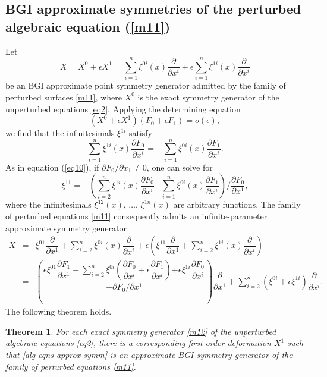\documentclass[11pt,letter,subeqn]{article}
\def\beq{\begin{equation}}
\def\eeq{\end{equation}}
\newtheorem{theorem}{Theorem}[section]
\begin{document}
\subsection{BGI approximate symmetries of the perturbed algebraic equation (\ref{m11})}\label{sec:Pr:sym}
Let
\beq \label{alg eqns approx symm}
      X= X^0+\epsilon X^1 = \sum_{i=1}^{n}\xi^{0i}(x)\dfrac{\partial}{\partial x^i} +\epsilon \sum_{i=1}^{n}\xi^{1i}(x)\dfrac{\partial}{\partial x^i}
\eeq
be an BGI approximate point symmetry generator admitted by the family of perturbed surfaces \eqref{m11}, where $X^0$ is the exact symmetry generator of the unperturbed equations \eqref{eq2}. Applying the determining equation
\[
  \left( X^0+\epsilon X^1\right)\left(F_0+\epsilon F_1\right)=o(\epsilon),
\]
we find that the infinitesimals $\xi^{1i}$ satisfy
\begin{equation}\label{m104}
\sum_{i=1}^{n}\xi^{1i}(x)\dfrac{\partial F_0}{\partial x^i}=- \sum_{i=1}^{n}\xi^{0i}(x)\dfrac{\partial F_1}{\partial x^i}.
\end{equation}
As in equation (\ref{eq10}), if ${\partial
F_0}\big/{\partial x_1}\neq 0$, one can solve for
\begin{equation}\label{eq11}
\xi^{11}= -\left({\sum_{i=2}^{n}\xi^{1i}(x)\frac{\partial F_0}{\partial x^i}}{+\sum_{i=1}^{n}\xi^{0i}(x)\frac{\partial F_1}{\partial x^i}}\right)\bigg/{\frac{\partial
F_0}{\partial x^1}},
\end{equation}
where the infinitesimals $\xi^{12}(x)$, $\ldots$, $\xi^{1n}(x)$ are arbitrary functions. The family of perturbed equations \eqref{m11} consequently admits an infinite-parameter approximate symmetry generator
\begin{eqnarray}\label{eq19}
\nonumber %
X &=& \xi^{01}\dfrac{\partial}{\partial x^1}+ \sum_{i=2}^{n}\xi^{0i}(x)\dfrac{\partial}{\partial x^i}+\epsilon \left(\xi^{11}\dfrac{\partial}{\partial x^1}+
\sum_{i=2}^{n}\xi^{1i}(x)\dfrac{\partial}{\partial x^i}\right) \\
&=&  \left(\dfrac{{\epsilon \xi^{01} \dfrac{\partial F_1}{\partial x^1}+\sum \limits_{i=2}^{n}\xi^{0i}\left(\dfrac{\partial F_0}{\partial x^i}+\epsilon \dfrac{\partial
F_1}{\partial x^i} \right)}{+\epsilon \xi^{1i}\dfrac{\partial F_0}{\partial x^i}}} {{{-\partial F_0}\big/{\partial x^1}}}\right)\dfrac{\partial}{\partial
x^1}+\sum_{i=2}^{n}\left(\xi^{0i}+\epsilon \xi^{1i}\right)\dfrac{\partial}{\partial x^i}.
\end{eqnarray}
The following theorem holds.
\begin{theorem}\label{stability of alg eqn}
For each exact symmetry generator \eqref{m12} of the unperturbed algebraic equations \eqref{eq2}, there is a corresponding first-order deformation $X^1$ such that
\eqref{alg eqns approx symm} is an approximate BGI symmetry generator of the family of perturbed equations \eqref{m11}.
\end{theorem}
\end{document}
